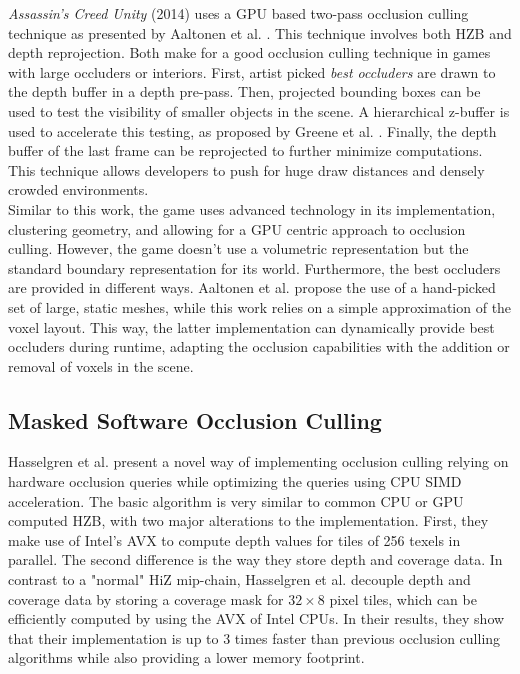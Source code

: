 \emph{Assassin's Creed Unity} (2014) uses a \ac{GPU} based two-pass occlusion culling technique as presented by 
Aaltonen et al. \cite{Aaltonen2015}. This technique involves both \ac{HZB} and depth reprojection. Both make for 
a good occlusion culling technique in games with large occluders or interiors. First, artist picked 
\emph{best occluders} are drawn to the depth buffer in a depth pre-pass. Then, projected bounding boxes can be 
used to test the visibility of smaller objects in the scene. A hierarchical z-buffer is used to accelerate this 
testing, as proposed by Greene et al. \cite{Greene93,Greene95}. Finally, the depth buffer of the last frame can be 
reprojected to further minimize computations. This technique allows developers to push for huge draw distances and 
densely crowded environments.\\

\noindent
Similar to this work, the game uses advanced technology in its implementation, clustering geometry, and allowing 
for a \ac{GPU} centric approach to occlusion culling. However, the game doesn't use a volumetric representation 
but the standard boundary representation for its world. Furthermore, the best occluders are provided in different 
ways. Aaltonen et al. \cite{Aaltonen2015} propose the use of a hand-picked set of large, static meshes, while this 
work relies on a simple approximation of the voxel layout. This way, the latter implementation can dynamically 
provide best occluders during runtime, adapting the occlusion capabilities with the addition or removal of voxels 
in the scene.


\subsection*{Masked Software Occlusion Culling}

Hasselgren et al. \cite{Hasselgren2016} present a novel way of implementing occlusion culling relying on hardware 
occlusion queries while optimizing the queries using \ac{CPU} \ac{SIMD} acceleration. The basic algorithm is very 
similar to common \ac{CPU} or \ac{GPU} computed \ac{HZB}, with two major alterations to the implementation. First, 
they make use of Intel's \ac{AVX} to compute depth values for tiles of 256 texels in parallel. The second difference 
is the way they store depth and coverage data. In contrast to a "normal" \ac{HiZ} mip-chain, Hasselgren et al. 
decouple depth and coverage data by storing a coverage mask for \begin{math}32 \times 8\end{math} pixel tiles, 
which can be efficiently computed by using the \ac{AVX} of Intel \ac{CPU}s. In their results, they show that their 
implementation is up to 3 times faster than previous occlusion culling algorithms while also providing a lower 
memory footprint. \\

